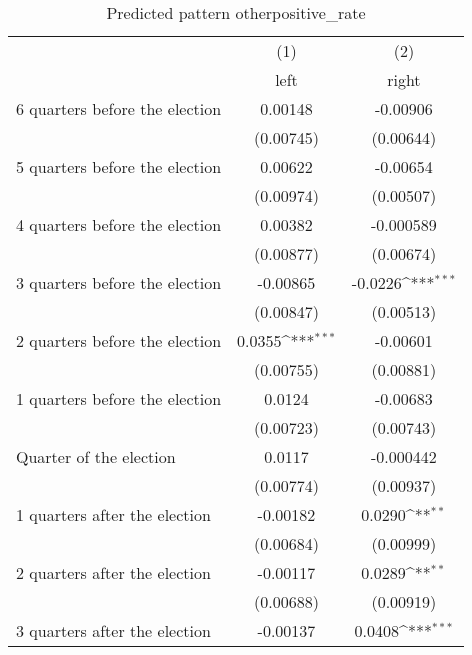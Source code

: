 \begin{table}[htbp]\centering
\def\sym#1{\ifmmode^{#1}\else\(^{#1}\)\fi}
\caption{Predicted pattern otherpositive\_rate}
\begin{tabular}{l*{2}{c}}
\hline\hline
                    &\multicolumn{1}{c}{(1)}&\multicolumn{1}{c}{(2)}\\
                    &\multicolumn{1}{c}{left}&\multicolumn{1}{c}{right}\\
\hline
 6 quarters before the election&     0.00148         &    -0.00906         \\
                    &   (0.00745)         &   (0.00644)         \\
[1em]
 5 quarters before the election&     0.00622         &    -0.00654         \\
                    &   (0.00974)         &   (0.00507)         \\
[1em]
 4 quarters before the election&     0.00382         &   -0.000589         \\
                    &   (0.00877)         &   (0.00674)         \\
[1em]
 3 quarters before the election&    -0.00865         &     -0.0226\sym{***}\\
                    &   (0.00847)         &   (0.00513)         \\
[1em]
 2 quarters before the election&      0.0355\sym{***}&    -0.00601         \\
                    &   (0.00755)         &   (0.00881)         \\
[1em]
 1 quarters before the election&      0.0124         &    -0.00683         \\
                    &   (0.00723)         &   (0.00743)         \\
[1em]
Quarter of the election&      0.0117         &   -0.000442         \\
                    &   (0.00774)         &   (0.00937)         \\
[1em]
 1 quarters after the election&    -0.00182         &      0.0290\sym{**} \\
                    &   (0.00684)         &   (0.00999)         \\
[1em]
 2 quarters after the election&    -0.00117         &      0.0289\sym{**} \\
                    &   (0.00688)         &   (0.00919)         \\
[1em]
 3 quarters after the election&    -0.00137         &      0.0408\sym{***}\\

\end{tabular}
\end{table}

